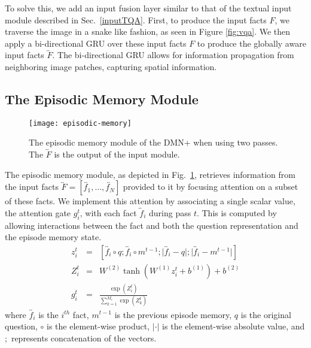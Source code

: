 \documentclass{article}
\begin{document}
To solve this, we add an input fusion layer similar to that of the textual input module described in Sec.~\ref{inputTQA}.
First, to produce the input facts $F$, we traverse the image in a snake like fashion, as seen in Figure \ref{fig:vqa}.
We then apply a bi-directional GRU over these input facts $F$ to produce the globally aware input facts $\overleftrightarrow{F}$.
The bi-directional GRU allows for information propagation from neighboring image patches, capturing spatial information.






\subsection{The Episodic Memory Module}
\begin{figure}
\centering
\texttt{[image: episodic-memory]}
\vspace{-0.3cm}
\caption{The episodic memory module of the DMN+ when using two passes. The $\overleftrightarrow{F}$ is the output of the input module.
\label{fig:episodicModule}
}
\end{figure}

The episodic memory module, as depicted in Fig.~\ref{fig:episodicModule}, retrieves information from the input facts $\overleftrightarrow{F} = [\overleftrightarrow{f_1}, \hdots, \overleftrightarrow{f_N}]$ provided to it by focusing attention on a subset of these facts.
We implement this attention by associating a single scalar value, the attention gate $g^t_i$, with each fact $\overleftrightarrow{f}_i$ during pass $t$.
This is computed by allowing interactions between the fact and both the question representation and the episode memory state.
\setlength\arraycolsep{0.4pt}
\begin{eqnarray}
z^t_i &=& [\overleftrightarrow{f_i} \circ q; \overleftrightarrow{f_i} \circ m^{t-1}; \lvert \overleftrightarrow{f_i} - q \rvert; \lvert \overleftrightarrow{f_i} - m^{t-1} \rvert]\label{eq:z} \\
Z^t_i &=& W^{(2)} \tanh\left(W^{(1)}z^t_i + b^{(1)} \right)+ b^{(2)} \\
g^t_i &=& \frac{\exp(Z^t_i)}{\sum_{k=1}^{M_i} \exp(Z^t_k)} \label{eq:attn-gate}
\end{eqnarray}
where $\overleftrightarrow{f_i}$ is the $i^{th}$ fact, $m^{t-1}$ is the previous episode memory, $q$ is the original question, $\circ$ is the element-wise product, $|\cdot|$ is the element-wise absolute value, and $;$ represents concatenation of the vectors.
\end{document}
